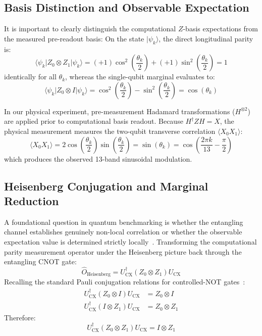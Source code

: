 \documentclass[11pt,a4paper]{article}
\begin{document}
\subsection{Basis Distinction and Observable Expectation}
It is important to clearly distinguish the computational $Z$-basis expectations from the measured pre-readout basis:
On the state $|\psi_k\rangle$, the direct longitudinal parity is:
\begin{equation}
  \langle \psi_k | Z_0 \otimes Z_1 | \psi_k \rangle = (+1)\cos^2\left(\frac{\theta_k}{2}\right) + (+1)\sin^2\left(\frac{\theta_k}{2}\right) = 1
\end{equation}
identically for all $\theta_k$, whereas the single-qubit marginal evaluates to:
\begin{equation}
  \langle \psi_k | Z_0 \otimes I | \psi_k \rangle = \cos^2\left(\frac{\theta_k}{2}\right) - \sin^2\left(\frac{\theta_k}{2}\right) = \cos(\theta_k)
\end{equation}

In our physical experiment, pre-measurement Hadamard transformations ($H^{\otimes 2}$) are applied prior to computational basis readout. Because $H^\dagger Z H = X$, the physical measurement measures the two-qubit transverse correlation $\langle X_0 X_1 \rangle$:
\begin{equation}
  \langle X_0 X_1 \rangle = 2\cos\left(\frac{\theta_k}{2}\right)\sin\left(\frac{\theta_k}{2}\right) = \sin(\theta_k) = \cos\left(\frac{2\pi k}{13} - \frac{\pi}{2}\right)
\end{equation}
which produces the observed 13-band sinusoidal modulation.

\subsection{Heisenberg Conjugation and Marginal Reduction}
A foundational question in quantum benchmarking is whether the entangling channel establishes genuinely non-local correlation or whether the observable expectation value is determined strictly locally~\cite{nielsen_chuang}. Transforming the computational parity measurement operator under the Heisenberg picture back through the entangling CNOT gate:
\begin{equation}
  \hat{O}_{\text{Heisenberg}} = U_{\text{CX}}^{\dagger} (Z_0 \otimes Z_1) U_{\text{CX}}
\end{equation}
Recalling the standard Pauli conjugation relations for controlled-NOT gates~\cite{nielsen_chuang,gottesman1998heisenberg}:
\begin{align}
  U_{\text{CX}}^{\dagger} (Z_0 \otimes I) U_{\text{CX}} &= Z_0 \otimes I \\
  U_{\text{CX}}^{\dagger} (I \otimes Z_1) U_{\text{CX}} &= Z_0 \otimes Z_1
\end{align}
Therefore:
\begin{equation}
  U_{\text{CX}}^{\dagger} (Z_0 \otimes Z_1) U_{\text{CX}} = I \otimes Z_1
\end{equation}
\end{document}
